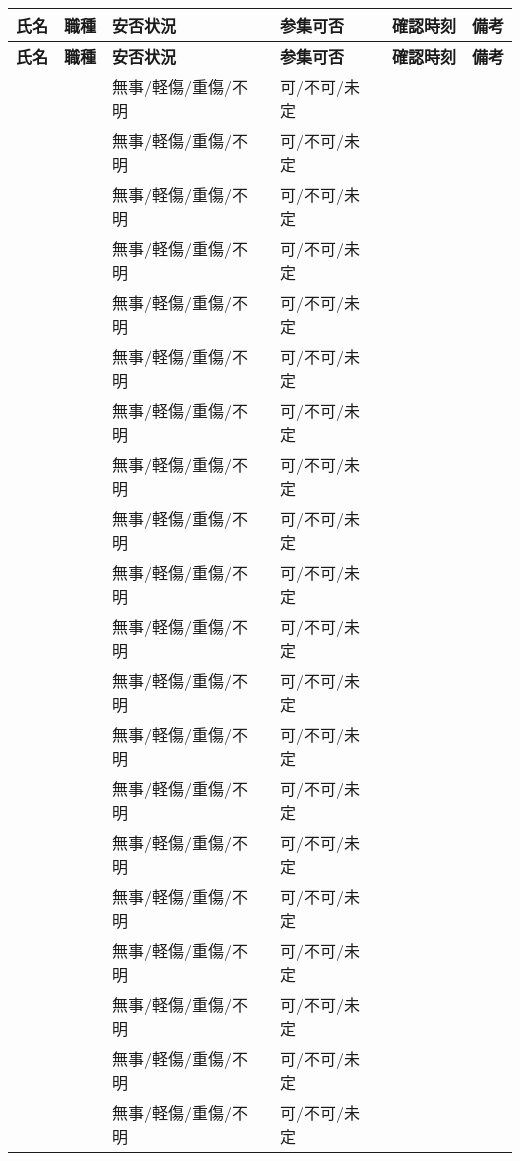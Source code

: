 \documentclass[a4paper,12pt]{jarticle}
\begin{document}
\begin{longtable}{|p{2.5cm}|p{2cm}|p{2.5cm}|p{2cm}|p{1.5cm}|p{2.5cm}|}
\hline
\textbf{氏名} & \textbf{職種} & \textbf{安否状況} & \textbf{参集可否} & \textbf{確認時刻} & \textbf{備考} \\
\hline
\endfirsthead

\hline
\textbf{氏名} & \textbf{職種} & \textbf{安否状況} & \textbf{参集可否} & \textbf{確認時刻} & \textbf{備考} \\
\hline
\endhead

 &  & 無事/軽傷/重傷/不明 & 可/不可/未定 &  &  \\
\hline
 &  & 無事/軽傷/重傷/不明 & 可/不可/未定 &  &  \\
\hline
 &  & 無事/軽傷/重傷/不明 & 可/不可/未定 &  &  \\
\hline
 &  & 無事/軽傷/重傷/不明 & 可/不可/未定 &  &  \\
\hline
 &  & 無事/軽傷/重傷/不明 & 可/不可/未定 &  &  \\
\hline
 &  & 無事/軽傷/重傷/不明 & 可/不可/未定 &  &  \\
\hline
 &  & 無事/軽傷/重傷/不明 & 可/不可/未定 &  &  \\
\hline
 &  & 無事/軽傷/重傷/不明 & 可/不可/未定 &  &  \\
\hline
 &  & 無事/軽傷/重傷/不明 & 可/不可/未定 &  &  \\
\hline
 &  & 無事/軽傷/重傷/不明 & 可/不可/未定 &  &  \\
\hline
 &  & 無事/軽傷/重傷/不明 & 可/不可/未定 &  &  \\
\hline
 &  & 無事/軽傷/重傷/不明 & 可/不可/未定 &  &  \\
\hline
 &  & 無事/軽傷/重傷/不明 & 可/不可/未定 &  &  \\
\hline
 &  & 無事/軽傷/重傷/不明 & 可/不可/未定 &  &  \\
\hline
 &  & 無事/軽傷/重傷/不明 & 可/不可/未定 &  &  \\
\hline
 &  & 無事/軽傷/重傷/不明 & 可/不可/未定 &  &  \\
\hline
 &  & 無事/軽傷/重傷/不明 & 可/不可/未定 &  &  \\
\hline
 &  & 無事/軽傷/重傷/不明 & 可/不可/未定 &  &  \\
\hline
 &  & 無事/軽傷/重傷/不明 & 可/不可/未定 &  &  \\
\hline
 &  & 無事/軽傷/重傷/不明 & 可/不可/未定 &  &  \\
\hline
\end{longtable}

\vspace{5mm}
\end{document}

